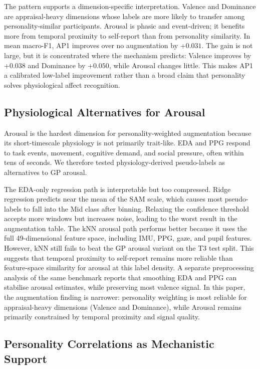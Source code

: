 \documentclass[sigconf,review,anonymous]{acmart}
\begin{document}
The pattern supports a dimension-specific interpretation.
Valence and Dominance are appraisal-heavy dimensions whose labels are more
likely to transfer among personality-similar participants.
Arousal is phasic and event-driven; it benefits more from temporal proximity
to self-report than from personality similarity.
In mean macro-F1, AP1 improves over no augmentation by $+0.031$.
The gain is not large, but it is concentrated where the mechanism predicts:
Valence improves by $+0.038$ and Dominance by $+0.050$, while Arousal changes
little.
This makes AP1 a calibrated low-label improvement rather than a broad claim
that personality solves physiological affect recognition.

\subsection{Physiological Alternatives for Arousal}
\label{sec:arousal_alternatives}

Arousal is the hardest dimension for personality-weighted augmentation because
its short-timescale physiology is not primarily trait-like.
EDA and PPG respond to task events, movement, cognitive demand, and social
pressure, often within tens of seconds.
We therefore tested physiology-derived pseudo-labels as alternatives to GP
arousal.

The EDA-only regression path is interpretable but too compressed.
Ridge regression predicts near the mean of the SAM scale, which causes most
pseudo-labels to fall into the Mid class after binning.
Relaxing the confidence threshold accepts more windows but increases noise,
leading to the worst result in the augmentation table.
The kNN arousal path performs better because it uses the full 49-dimensional
feature space, including IMU, PPG, gaze, and pupil features.
However, kNN still fails to beat the GP arousal variant on the T3 test split.
This suggests that temporal proximity to self-report remains more reliable
than feature-space similarity for arousal at this label density.
A separate preprocessing analysis of the same benchmark reports that smoothing
EDA and PPG can stabilise arousal estimates, while preserving most valence
signal. In this paper, the augmentation finding is narrower: personality
weighting is most reliable for appraisal-heavy dimensions (Valence and
Dominance), while Arousal remains primarily constrained by temporal
proximity and signal quality.

\subsection{Personality Correlations as Mechanistic Support}
\label{sec:bfi_support}
\end{document}
